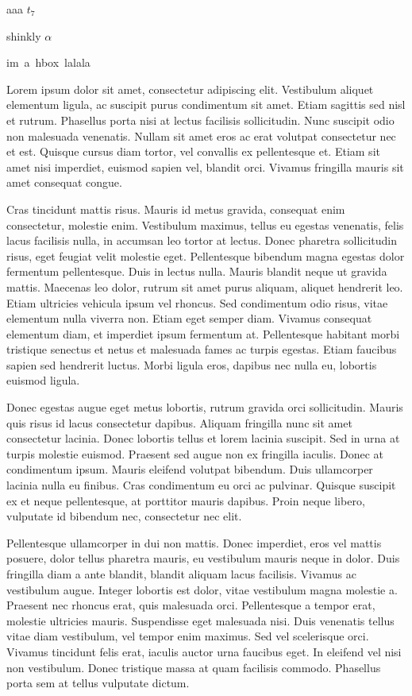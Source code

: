 
aaa $t_7$

shinkly $\alpha$

\hbox{im a hbox lalala}

Lorem ipsum dolor sit amet, consectetur adipiscing elit. Vestibulum aliquet elementum ligula, ac suscipit purus condimentum sit amet. Etiam sagittis sed nisl et rutrum. Phasellus porta nisi at lectus facilisis sollicitudin. Nunc suscipit odio non malesuada venenatis. Nullam sit amet eros ac erat volutpat consectetur nec et est. Quisque cursus diam tortor, vel convallis ex pellentesque et. Etiam sit amet nisi imperdiet, euismod sapien vel, blandit orci. Vivamus fringilla mauris sit amet consequat congue.

Cras tincidunt mattis risus. Mauris id metus gravida, consequat enim consectetur, molestie enim. Vestibulum maximus, tellus eu egestas venenatis, felis lacus facilisis nulla, in accumsan leo tortor at lectus. Donec pharetra sollicitudin risus, eget feugiat velit molestie eget. Pellentesque bibendum magna egestas dolor fermentum pellentesque. Duis in lectus nulla. Mauris blandit neque ut gravida mattis. Maecenas leo dolor, rutrum sit amet purus aliquam, aliquet hendrerit leo. Etiam ultricies vehicula ipsum vel rhoncus. Sed condimentum odio risus, vitae elementum nulla viverra non. Etiam eget semper diam. Vivamus consequat elementum diam, et imperdiet ipsum fermentum at. Pellentesque habitant morbi tristique senectus et netus et malesuada fames ac turpis egestas. Etiam faucibus sapien sed hendrerit luctus. Morbi ligula eros, dapibus nec nulla eu, lobortis euismod ligula.

Donec egestas augue eget metus lobortis, rutrum gravida orci sollicitudin. Mauris quis risus id lacus consectetur dapibus. Aliquam fringilla nunc sit amet consectetur lacinia. Donec lobortis tellus et lorem lacinia suscipit. Sed in urna at turpis molestie euismod. Praesent sed augue non ex fringilla iaculis. Donec at condimentum ipsum. Mauris eleifend volutpat bibendum. Duis ullamcorper lacinia nulla eu finibus. Cras condimentum eu orci ac pulvinar. Quisque suscipit ex et neque pellentesque, at porttitor mauris dapibus. Proin neque libero, vulputate id bibendum nec, consectetur nec elit.

Pellentesque ullamcorper in dui non mattis. Donec imperdiet, eros vel mattis posuere, dolor tellus pharetra mauris, eu vestibulum mauris neque in dolor. Duis fringilla diam a ante blandit, blandit aliquam lacus facilisis. Vivamus ac vestibulum augue. Integer lobortis est dolor, vitae vestibulum magna molestie a. Praesent nec rhoncus erat, quis malesuada orci. Pellentesque a tempor erat, molestie ultricies mauris. Suspendisse eget malesuada nisi. Duis venenatis tellus vitae diam vestibulum, vel tempor enim maximus. Sed vel scelerisque orci. Vivamus tincidunt felis erat, iaculis auctor urna faucibus eget. In eleifend vel nisi non vestibulum. Donec tristique massa at quam facilisis commodo. Phasellus porta sem at tellus vulputate dictum.

